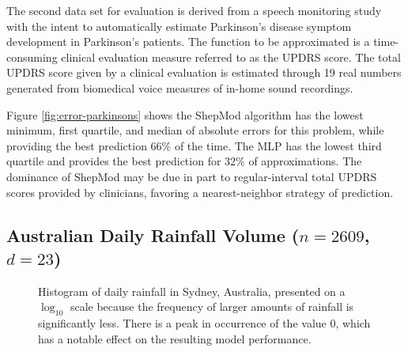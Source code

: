 \documentclass[smallextended,final]{svjour3}       %
\begin{document}
The second data set for evaluation \cite{tsanas2010accurate} is derived
from a speech monitoring study with the intent to automatically estimate
Parkinson's disease symptom development in Parkinson's patients. The
function to be approximated is a time-consuming clinical evaluation measure
referred to as the UPDRS score. The total UPDRS score given by a clinical
evaluation is estimated through 19 real numbers generated from biomedical
voice measures of in-home sound recordings.

Figure \ref{fig:error-parkinsons} shows the ShepMod algorithm has the
lowest minimum, first quartile, and median of absolute errors for this
problem, while providing the best prediction 66\% of the time. The MLP has
the lowest third quartile and provides the best prediction for 32\% of
approximations. The dominance of ShepMod may be due in part to
regular-interval total UPDRS scores provided by clinicians, favoring a
nearest-neighbor strategy of prediction.



\subsection{Australian Daily Rainfall Volume ($n = 2609$, $d = 23$)}

\begin{figure}
  \centering
  \caption{Histogram of daily rainfall in Sydney, Australia, presented on a
$\log_{10}$ scale because the frequency of larger amounts of rainfall
is significantly less. There is a peak in occurrence of the value $0$,
which has a notable effect on the resulting model performance.}
  \label{fig:hist-weather}
\end{figure}
\end{document}
